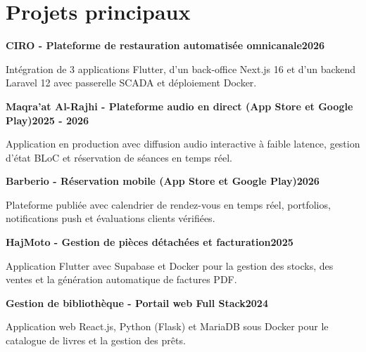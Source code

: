 \documentclass[letterpaper,10pt]{article}
\newcommand{\heading}[2]{\hspace{10pt}#1\hfill#2\\}
\newcommand{\headingBf}[2]{\heading{\textbf{#1}}{\textbf{#2}}}
\newenvironment{resume_list}{
  \vspace{-7pt}
  \begin{itemize}[itemsep=-2pt, parsep=1pt, leftmargin=30pt]
}{
  \end{itemize}
}
\begin{document}
\section{Projets principaux}

\headingBf{CIRO - Plateforme de restauration automatisée omnicanale}{2026}

\begin{resume_list}

  \item Intégration de 3 applications Flutter, d'un back-office Next.js 16 et d'un backend Laravel 12 avec passerelle SCADA et déploiement Docker.

\end{resume_list}

\headingBf{Maqra'at Al-Rajhi - Plateforme audio en direct (App Store et Google Play)}{2025 - 2026}

\begin{resume_list}

  \item Application en production avec diffusion audio interactive à faible latence, gestion d'état BLoC et réservation de séances en temps réel.

\end{resume_list}

\headingBf{Barberio - Réservation mobile (App Store et Google Play)}{2026}

\begin{resume_list}

  \item Plateforme publiée avec calendrier de rendez-vous en temps réel, portfolios, notifications push et évaluations clients vérifiées.

\end{resume_list}

\headingBf{HajMoto - Gestion de pièces détachées et facturation}{2025}

\begin{resume_list}

  \item Application Flutter avec Supabase et Docker pour la gestion des stocks, des ventes et la génération automatique de factures PDF.

\end{resume_list}

\headingBf{Gestion de bibliothèque - Portail web Full Stack}{2024}

\begin{resume_list}

  \item Application web React.js, Python (Flask) et MariaDB sous Docker pour le catalogue de livres et la gestion des prêts.

\end{resume_list}
\end{document}
